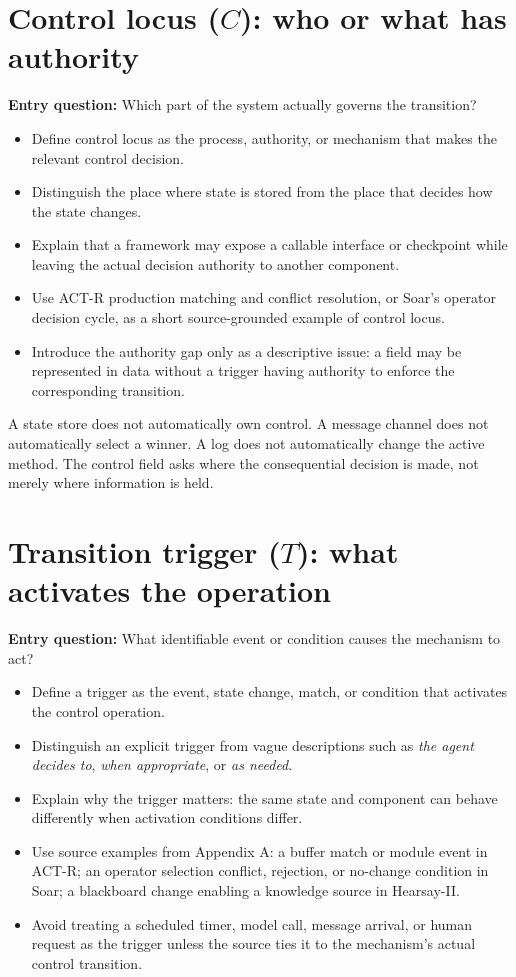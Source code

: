 \section{Control locus ($C$): who or what has authority}
\textbf{Entry question:} Which part of the system actually governs the transition?
\begin{itemize}
  \item Define control locus as the process, authority, or mechanism that makes the relevant control decision.
  \item Distinguish the place where state is stored from the place that decides how the state changes.
  \item Explain that a framework may expose a callable interface or checkpoint while leaving the actual decision authority to another component.
  \item Use ACT-R production matching and conflict resolution, or Soar's operator decision cycle, as a short source-grounded example of control locus.
  \item Introduce the authority gap only as a descriptive issue: a field may be represented in data without a trigger having authority to enforce the corresponding transition.
\end{itemize}
\begin{notebox}
A state store does not automatically own control. A message channel does not automatically select a winner. A log does not automatically change the active method. The control field asks where the consequential decision is made, not merely where information is held.
\end{notebox}

\section{Transition trigger ($T$): what activates the operation}
\textbf{Entry question:} What identifiable event or condition causes the mechanism to act?
\begin{itemize}
  \item Define a trigger as the event, state change, match, or condition that activates the control operation.
  \item Distinguish an explicit trigger from vague descriptions such as \emph{the agent decides to}, \emph{when appropriate}, or \emph{as needed}.
  \item Explain why the trigger matters: the same state and component can behave differently when activation conditions differ.
  \item Use source examples from Appendix A: a buffer match or module event in ACT-R; an operator selection conflict, rejection, or no-change condition in Soar; a blackboard change enabling a knowledge source in Hearsay-II.
  \item Avoid treating a scheduled timer, model call, message arrival, or human request as the trigger unless the source ties it to the mechanism's actual control transition.
\end{itemize}


